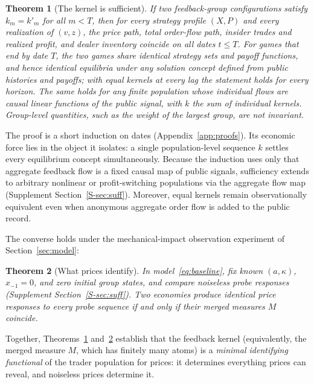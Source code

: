 \documentclass[11pt,letterpaper]{article}
\newtheorem{theorem}{Theorem}[section]
\theoremstyle{definition}
\begin{document}
\begin{theorem}[The kernel is sufficient]\label{n:suff}
If two feedback-group configurations satisfy $k_m = k'_m$ for all $m < T$, then for every strategy profile $(X, P)$ and every realization of $(v, z)$, the price path, total order-flow path, insider trades and realized profit, and dealer inventory coincide on all dates $t \le T$. For games that end by date $T$, the two games share identical strategy sets and payoff functions, and hence identical equilibria under any solution concept defined from public histories and payoffs; with equal kernels at every lag the statement holds for every horizon. The same holds for any finite population whose individual flows are causal linear functions of the public signal, with $k$ the sum of individual kernels. Group-level quantities, such as the weight of the largest group, are not invariant.
\end{theorem}

The proof is a short induction on dates (Appendix~\ref{app:proofs}). Its economic force lies in the object it isolates: a single population-level sequence $k$ settles every equilibrium concept simultaneously. Because the induction uses only that aggregate feedback flow is a fixed causal map of public signals, sufficiency extends to arbitrary nonlinear or profit-switching populations via the aggregate flow map (Supplement Section~\ref{S-sec:suff}). Moreover, equal kernels remain observationally equivalent even when anonymous aggregate order flow is added to the public record.

The converse holds under the mechanical-impact observation experiment of Section~\ref{sec:model}:

\begin{theorem}[What prices identify]\label{n:ident}\label{thm:what-id}
In model~\eqref{eq:baseline}, fix known $(a, \kappa)$, $x_{-1} = 0$, and zero initial group states, and compare noiseless probe responses (Supplement Section~\ref{S-sec:suff}). Two economies produce identical price responses to every probe sequence if and only if their merged measures $M$ coincide.
\end{theorem}

Together, Theorems~\ref{n:suff} and~\ref{n:ident} establish that the feedback kernel (equivalently, the merged measure $M$, which has finitely many atoms) is a \emph{minimal identifying functional} of the trader population for prices: it determines everything prices can reveal, and noiseless prices determine it.
\end{document}
